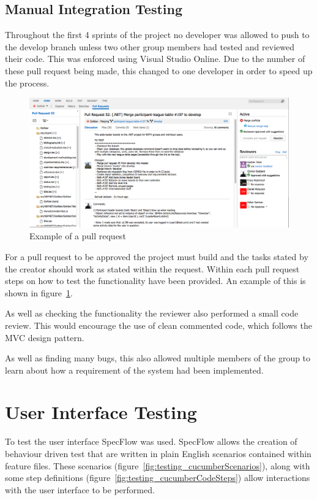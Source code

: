 \subsection{Manual Integration Testing}
Throughout the first 4 sprints of the project no developer was allowed to push to the develop branch unless two other group members had tested and reviewed their code. This was enforced using Visual Studio Online. Due to the number of these pull request being made, this changed to one developer in order to speed up the process.

\begin{figure}[H]
\begin{center}
\includegraphics[scale=0.3]{images/testing/PullRequest.png} 
\caption{Example of a pull request}
\label{fig:testing_pullRequest}
\end{center}
\end{figure}

For a pull request to be approved the project must build and the tasks stated by the creator should work as stated within the request. Within each pull request steps on how to test the functionality have been provided. An example of this is shown in figure~\ref{fig:testing_pullRequest}.

As well as checking the functionality the reviewer also performed a small code review. This would encourage the use of clean commented code, which follows the MVC design pattern.

As well as finding many bugs, this also allowed multiple members of the group to learn about how a requirement of the system had been implemented.

\section{User Interface Testing}

To test the user interface SpecFlow \cite{SpecFlow} was used. SpecFlow allows the creation of behaviour driven test that are written in plain English scenarios contained within feature files. These scenarios (figure~\ref{fig:testing_cucumberScenarios}), along with some step definitions (figure~\ref{fig:testing_cucumberCodeSteps}) allow interactions with the user interface to be performed. 

